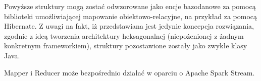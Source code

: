 









Powyższe struktury mogą zostać odwzorowane jako encje bazodanowe za pomocą biblioteki umożliwiającej mapowanie obiektowo-relacyjne, na przykład za pomocą Hibernate. Z uwagi na fakt, iż przedstawiana jest jedynie koncepcja rozwiązania, zgodnie z ideą tworzenia architektury heksagonalnej (niepożenionej z żadnym konkretnym frameworkiem), struktury pozostawione zostały jako zwykłe klasy Java.

Mapper i Reducer może bezpośrednio działać w oparciu o Apache Spark Stream.

